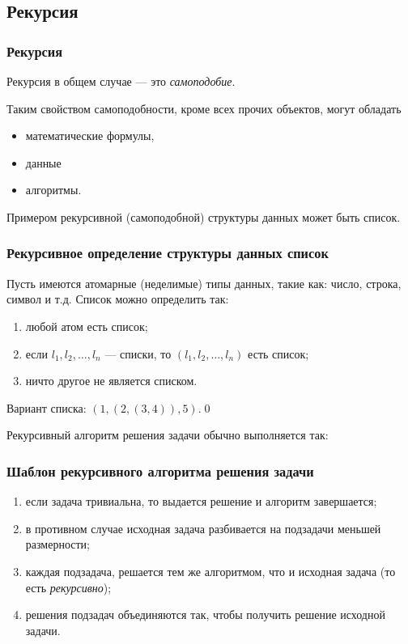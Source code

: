 \subsection{Рекурсия}

\begin{frame}
    \frametitle{Рекурсия}
    \begin{definition}
        \alert{Рекурсия} в общем случае --- это \emph{самоподобие}. 
    \end{definition}
    
    Таким свойством самоподобности, кроме всех прочих объектов, могут обладать
    \begin{itemize}
        \item математические формулы, 
        \item данные 
        \item алгоритмы. 
    \end{itemize}
\end{frame}

Примером рекурсивной (самоподобной) структуры данных может быть список.

\begin{frame}
    \frametitle{Рекурсивное определение структуры данных \alert{список}}
    \begin{example} 
        Пусть имеются атомарные (неделимые) типы данных, такие как: число, строка, символ и т.д. Список можно определить так:
        \begin{enumerate}
            \item любой атом есть \alert{список};
            \item если $l_1,l_2,\ldots,l_n$ --- списки, то $(l_1,l_2,\ldots,l_n)$ есть \alert{список};
            \item ничто другое не является списком.
        \end{enumerate}
        
        Вариант списка: $(1,(2,(3,4)),5)$.\qed
    \end{example}
\end{frame}

Рекурсивный алгоритм решения задачи обычно выполняется так:
\begin{frame}
    \frametitle{Шаблон рекурсивного алгоритма решения задачи}
    \begin{enumerate}
        \item<1-> если задача \alert<1>{тривиальна}, то выдается решение и алгоритм завершается;
        \item<2-> в противном случае исходная задача разбивается на \alert<2>{подзадачи} меньшей размерности;
        \item<3-> каждая \alert<3>{подзадача}, решается тем же алгоритмом, что и исходная задача (то есть \emph{рекурсивно});
        \item<4-> решения \alert<4>{подзадач} объединяются так, чтобы получить решение исходной \alert<4>{задачи}.
    \end{enumerate}
\end{frame}

